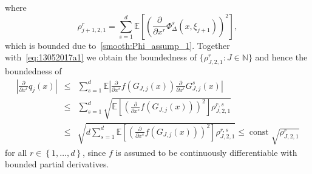 \documentclass[11pt,a4paper]{amsart}
\theoremstyle{plain}
\theoremstyle{definition}
\theoremstyle{remark}
\numberwithin{equation}{section}
\newcommand*{\EE}{\mathbb E}
\newcommand*{\NN}{\mathbb{N}}
\DeclareMathOperator{\const}{const}
\begin{document}
where 
\[
\rho_{j+1,2,1}^{r}=\sum_{s=1}^d\EE\left[\left(\frac{\partial}{\partial x^r}\Phi_{\Delta}^s\left(x,\xi_{j+1}\right)\right)^{2}\right],
\]
which is bounded due to~\eqref{smooth:Phi_assump_1}.
Together with~\eqref{eq:13052017a1}
we obtain the boundedness of
$\{\rho^r_{J,2,1}:J\in\NN\}$
and hence the boundedness of
\begin{eqnarray*}
\left|\frac{\partial}{\partial x^r}q_j(x)\right|&\le&\sum_{s=1}^d\EE\left|\frac{\partial }{\partial x^s}f(G_{J,j}(x))\frac{\partial}{\partial x^r}G_{J,j}^s(x)\right|\\
&\le &\sum_{s=1}^d\sqrt{\EE\left[\left(\frac{\partial }{\partial x^s}f(G_{J,j}(x))\right)^2\right]\rho_{J,2,1}^{r,s}}\\
&\le &\sqrt{d\sum_{s=1}^d
\EE\left[\left(\frac{\partial }{\partial x^s}f(G_{J,j}(x))\right)^2\right]\rho_{J,2,1}^{r,s}}
\le\const\sqrt{\rho^r_{J,2,1}}
\end{eqnarray*}
for all $r\in\left\{1,\ldots,d\right\}$, since $f$ is assumed to be continuously differentiable with bounded partial derivatives.
\end{document}
